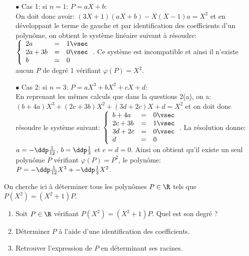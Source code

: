 \documentclass[a4paper, 11pt,reqno]{article}
\begin{document}
\begin{correction}
\begin{enumerate}
		      \begin{itemize}
			      \item[$\bullet$] Cas 1: si $n=1$: $P=aX+b$:\\
			            \noindent On doit donc avoir: $(3X+1)(aX+b)-X(X-1)a=X^2$ et en d\'eveloppant le terme de gauche et par identification des coefficients d'un polyn\^{o}me, on obtient le syst\`{e}me lin\'eaire suivant \`{a} r\'esoudre:
			            $\left\lbrace \begin{array}{lll} 2a&=&1\vsec\\2a+3b&=&0\vsec\\ b&=&0    \end{array}\right.$. Ce syst\`{e}me est incompatible et ainsi il n'existe aucun $P$ de degr\'e 1 v\'erifiant $\varphi(P)=X^2$.
			      \item[$\bullet$] Cas 2: si $n=3$: $P=aX^3+bX^2+cX+d$:\\
			            \noindent En reprenant les m\^{e}mes calculs que dans la questions 2(a), on a: $(b+4a)X^3+(2c+3b)X^2+(3d+2c)X+d=X^2$ et on doit donc r\'esoudre le syst\`{e}me suivant: $\left\lbrace \begin{array}{lll} b+4a&=&0\vsec\\2c+3b&=&1\vsec\\3d+2c&=&0\vsec\\ d&=&0    \end{array}\right.$. La r\'esolution donne: $a=-\ddp\frac{1}{12}$, $b=\ddp\frac{1}{3}$ et $c=d=0$. Ainsi on obtient qu'il existe un seul polyn\^{o}me $P$ v\'erifiant $\varphi(P)=P^2$, le polyn\^{o}me: $P=-\ddp\frac{1}{12} X^3+-\ddp\frac{1}{3}X^2$.
		      \end{itemize}
	\end{enumerate}
\end{correction}
\begin{exercice}  \;
	On cherche ici \`{a} d\'eterminer tous les polyn\^{o}mes $P\in\R$ tels que $P(X^2)=(X^2+1)P$.
	\begin{enumerate}
		\item Soit $P\in\R$ v\'erifiant $P(X^2)=(X^2+1)P$. Quel est son degr\'e ?
		\item D\'eterminer $P$ \`{a} l'aide d'une identification des coefficients.
		\item Retrouver l'expression de $P$ en d\'eterminant ses racines.
	\end{enumerate}
\end{exercice}
\end{document}
